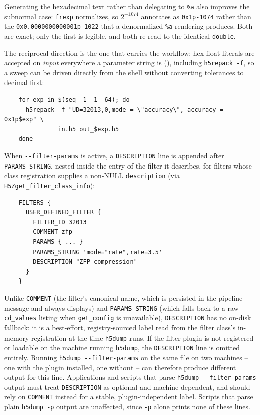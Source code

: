 \documentclass[../RFC-HDFG-2026-001.tex]{subfiles}
\begin{document}
Generating the hexadecimal text rather than delegating to \texttt{\%a} also
improves the subnormal case: \texttt{frexp} normalizes, so
$2^{-1074}$ annotates as \texttt{0x1p-1074} rather than the
\texttt{0x0.0000000000001p-1022} that a denormalized \texttt{\%a} rendering
produces.  Both are exact; only the first is legible, and both re-read to the
identical \texttt{double}.

The reciprocal direction is the one that carries the workflow: hex-float
literals are accepted on \emph{input} everywhere a parameter string is
(), including \texttt{h5repack~-f}, so a
sweep can be driven directly from the shell without converting tolerances
to decimal first:

\begin{verbatim}
    for exp in $(seq -1 -1 -64); do
      h5repack -f "UD=32013,0,mode = \"accuracy\", accuracy = 0x1p$exp" \
               in.h5 out_$exp.h5
    done
\end{verbatim}


When \texttt{-{}-filter-params} is active, a \texttt{DESCRIPTION} line is appended after
\texttt{PARAMS\_STRING}, nested inside the entry of the filter it describes,
for filters whose class registration supplies a non-NULL \texttt{description}
(via \texttt{H5Zget\_filter\_class\_info}):

\begin{verbatim}
    FILTERS {
      USER_DEFINED_FILTER {
        FILTER_ID 32013
        COMMENT zfp
        PARAMS { ... }
        PARAMS_STRING 'mode="rate",rate=3.5'
        DESCRIPTION "ZFP compression"
      }
    }
\end{verbatim}

Unlike \texttt{COMMENT} (the filter's canonical name, which is persisted in
the pipeline message and always displays) and \texttt{PARAMS\_STRING} (which
falls back to a raw \texttt{cd\_values} listing when \texttt{get\_config} is
unavailable), \texttt{DESCRIPTION} has no on-disk fallback: it is a
best-effort, registry-sourced label read from the filter class's in-memory
registration at the time \texttt{h5dump} runs. If the filter plugin is not
registered or loadable on the machine running \texttt{h5dump}, the
\texttt{DESCRIPTION} line is omitted entirely. Running
\texttt{h5dump -{}-filter-params} on
the same file on two machines -- one with the plugin installed, one without
-- can therefore produce different output for this line. Applications and
scripts that parse \texttt{h5dump -{}-filter-params} output must treat
\texttt{DESCRIPTION} as optional and machine-dependent, and should rely on
\texttt{COMMENT} instead for a stable, plugin-independent label.  Scripts
that parse plain \texttt{h5dump -p} output are unaffected, since
\texttt{-p} alone prints none of these lines.
\end{document}
